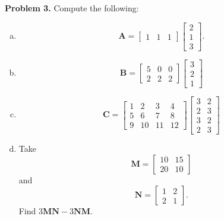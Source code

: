 \documentclass[12pt]{report} %
\theoremstyle{definition}
\begin{document}
\noindent\textbf{Problem 3.} Compute the following:
\begin{enumerate}[(a)]
    \item 
    \[
    \mathbf{A}=\begin{bmatrix} 1& 1& 1 \end{bmatrix}
    \begin{bmatrix} 2\\ 1\\ 3 \end{bmatrix}.
    \]
    \item 
    \[
    \mathbf{B}=\begin{bmatrix} 5& 0& 0\\ 2& 2& 2\end{bmatrix}
    \begin{bmatrix} 3\\ 2\\ 1 \end{bmatrix}
    \]
    \item
    \[
    \mathbf{C}=\begin{bmatrix} 1& 2& 3& 4\\ 5& 6& 7& 8\\ 9& 10& 11& 12\end{bmatrix}
    \begin{bmatrix} 3& 2\\ 2& 3\\ 3& 2\\ 2& 3\end{bmatrix}
    \]
    \item Take
    \[
    \mathbf{M}=\begin{bmatrix} 10& 15\\ 20& 10 \end{bmatrix}
    \]
    and
    \[
    \mathbf{N}=\begin{bmatrix} 1 & 2\\ 2& 1\end{bmatrix}.
    \]
    Find $3\mathbf{MN}-3\mathbf{NM}$.
\end{enumerate}
\end{document}
